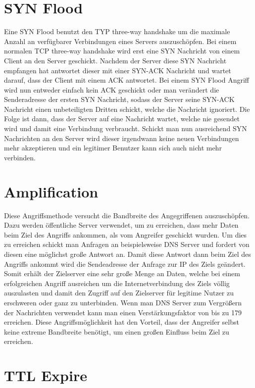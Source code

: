 \section{SYN Flood}

Eine SYN Flood benutzt den TYP three-way handshake um die maximale Anzahl an verfügbarer Verbindungen eines Servers auszuschöpfen. Bei einem normalen TCP three-way handshake wird erst eine SYN Nachricht von einem Client an den Server geschickt. Nachdem der Server diese SYN Nachricht empfangen hat antwortet dieser mit einer SYN-ACK Nachricht und wartet darauf, dass der Client mit einem ACK antwortet. Bei einem SYN Flood Angriff wird nun entweder einfach kein ACK geschickt oder man verändert die Senderadresse der ersten SYN Nachricht, sodass der Server seine SYN-ACK Nachricht einen unbeteiligten Dritten schickt, welche die Nachricht ignoriert. Die Folge ist dann, dass der Server auf eine Nachricht wartet, welche nie gesendet wird und damit eine Verbindung verbraucht. Schickt man nun ausreichend SYN Nachrichten an den Server wird dieser irgendwann keine neuen Verbindungen mehr akzeptieren und ein legitimer Benutzer kann sich auch nicht mehr verbinden.

\section{Amplification}

Diese Angriffsmethode versucht die Bandbreite des Angegriffenen auszuschöpfen. Dazu werden öffentliche Server verwendet, um zu erreichen, dass mehr Daten beim Ziel des Angriffs ankommen, als vom Angreifer geschickt wurden. Um dies zu erreichen schickt man Anfragen an beispielsweise DNS Server und fordert von diesen eine möglichst große Antwort an. Damit diese Antwort dann beim Ziel des Angriffs ankommt wird die Sendeadresse der  Anfrage zur IP des Ziels geändert. Somit erhält der Zielserver eine sehr große Menge an Daten, welche bei einem erfolgreichen Angriff ausreichen um die Internetverbindung des Ziels völlig auszulasten und damit den Zugriff auf den Zielserver für legitime Nutzer zu erschweren oder ganz zu unterbinden. Wenn man DNS Server zum Vergrößern der Nachrichten verwendet kann man einen Verstärkungsfaktor von bis zu 179 erreichen. Diese Angriffsmöglichkeit hat den Vorteil, dass der Angreifer selbst keine extreme Bandbreite benötigt, um einen großen Einfluss beim Ziel zu erreichen.

\section{TTL Expire}

